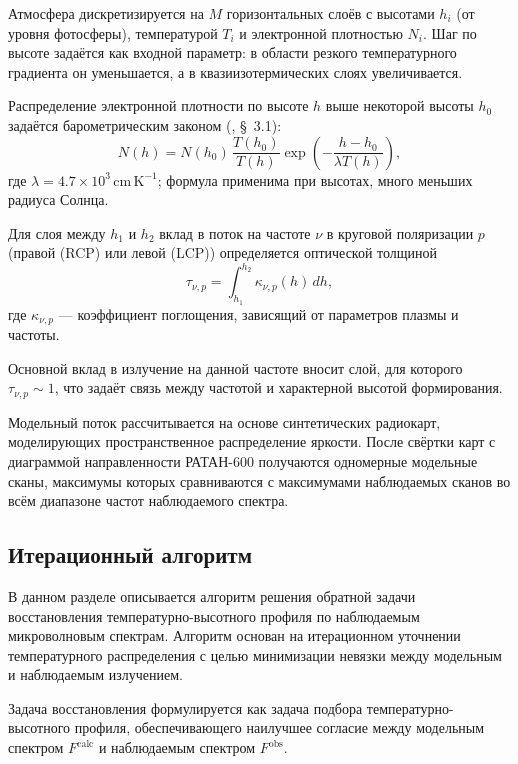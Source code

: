 \documentclass[
 aps, pra,
 amsmath,amssymb,
 11pt,
 final,
tightenlines,
 twoside,
 twocolumn,
 nofloats,
nofootinbib,
 superscriptaddress,
showkeys,
showkeywords,
 ]
{revtex4-2}
\newcommand{\as}[1]{{\color{blue} #1}}
\begin{document}
Атмосфера дискретизируется на $M$ горизонтальных слоёв
с высотами $h_i$ (от уровня фотосферы), температурой $T_i$ и электронной плотностью $N_i$.
Шаг по высоте задаётся как входной параметр:
в области резкого температурного градиента
он уменьшается, а в квазиизотермических слоях увеличивается.

Распределение электронной плотности по высоте $h$ выше некоторой высоты $h_0$
задаётся барометрическим законом
(\cite{Aschwanden2005}, \S~3.1):
\begin{equation}
N(h) = N(h_0)\,\frac{T(h_0)}{T(h)}
\exp\!\left(-\frac{h-h_0}{\lambda T(h)}\right),
\label{barometric}
\end{equation}
где $\lambda = 4.7 \times 10^3 \,\mathrm{cm\,K^{-1}}$; 
формула применима при высотах, много меньших радиуса Солнца.

Для слоя между $h_1$ и $h_2$ вклад в поток на частоте $\nu$ в \as{круговой поляризации $p$
(правой (RCP) или левой (LCP))} определяется оптической толщиной
\begin{equation}
\tau_{\nu,p} = \int_{h_1}^{h_2}
\kappa_{\nu,p}(h)\,dh,
\end{equation}
где $\kappa_{\nu,p}$ --- коэффициент поглощения, зависящий от параметров плазмы и частоты.

Основной вклад в излучение на данной частоте
вносит слой, для которого $\tau_{\nu,p} \sim 1$,
что задаёт связь между частотой и характерной высотой формирования.

Модельный поток рассчитывается на основе
синтетических радиокарт, моделирующих
пространственное распределение яркости.
\as{После свёртки карт с диаграммой направленности РАТАН-600 получаются одномерные модельные сканы, максимумы которых сравниваются с максимумами наблюдаемых сканов во всём диапазоне частот наблюдаемого спектра.}

\subsection{Итерационный алгоритм} 
\label{sec:iterations}

В данном разделе описывается алгоритм решения обратной задачи восстановления температурно-высотного профиля по наблюдаемым микроволновым спектрам. Алгоритм основан на итерационном уточнении температурного распределения с целью минимизации невязки между модельным и наблюдаемым излучением.

Задача восстановления формулируется как задача подбора температурно-высотного профиля, обеспечивающего наилучшее согласие между модельным спектром $F^{\mathrm{calc}}$ и наблюдаемым спектром $F^{\mathrm{obs}}$.
\end{document}
